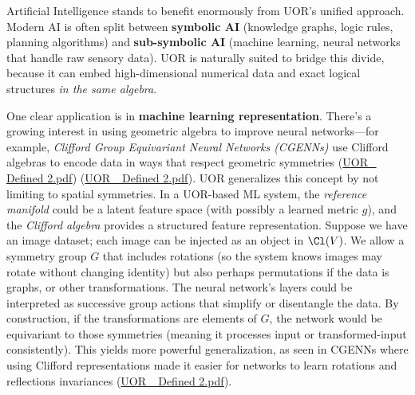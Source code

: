 \documentclass[12pt]{article}
\begin{document}
Artificial Intelligence stands to benefit enormously from UOR’s unified approach. Modern AI is often split between \textbf{symbolic AI} (knowledge graphs, logic rules, planning algorithms) and \textbf{sub-symbolic AI} (machine learning, neural networks that handle raw sensory data). UOR is naturally suited to bridge this divide, because it can embed high-dimensional numerical data and exact logical structures \emph{in the same algebra}.

\medskip

One clear application is in \textbf{machine learning representation}. There’s a growing interest in using geometric algebra to improve neural networks---for example, \emph{Clifford Group Equivariant Neural Networks (CGENNs)} use Clifford algebras to encode data in ways that respect geometric symmetries (\href{file://file-TBF3nHDaRR5QeVMmwCFYkp#:~:text=%E2%97%8F%20Machine%20Learning%3A%20High,embedded%20as%20elements%20and%20where}{UOR\_ Defined 2.pdf}) (\href{file://file-TBF3nHDaRR5QeVMmwCFYkp#:~:text=transformations%20are%20realized%20as%20group,equipped%20with%20a%20learned%20metric}{UOR\_ Defined 2.pdf}). UOR generalizes this concept by not limiting to spatial symmetries. In a UOR-based ML system, the \emph{reference manifold} could be a latent feature space (with possibly a learned metric $g$), and the \emph{Clifford algebra} provides a structured feature representation. Suppose we have an image dataset; each image can be injected as an object in $\Cl(V)$. We allow a symmetry group $G$ that includes rotations (so the system knows images may rotate without changing identity) but also perhaps permutations if the data is graphs, or other transformations. The neural network’s layers could be interpreted as successive group actions that simplify or disentangle the data. By construction, if the transformations are elements of $G$, the network would be equivariant to those symmetries (meaning it processes input or transformed-input consistently). This yields more powerful generalization, as seen in CGENNs where using Clifford representations made it easier for networks to learn rotations and reflections invariances (\href{file://file-TBF3nHDaRR5QeVMmwCFYkp#:~:text=machine%20learning%2C%20and%20Clifford%20,For%20instance%2C%20Clifford%20Group}{UOR\_ Defined 2.pdf}).

\medskip
\end{document}
